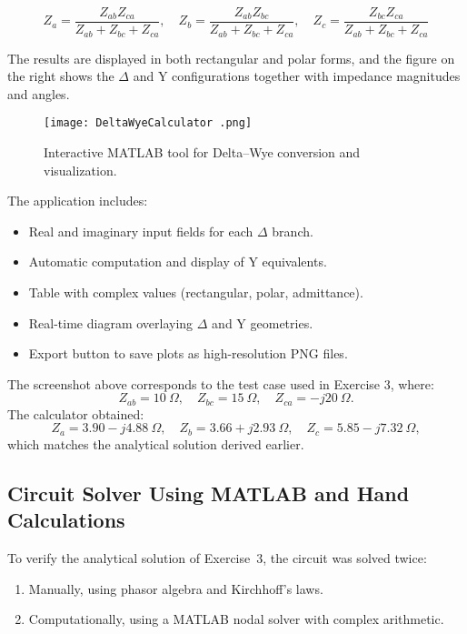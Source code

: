\documentclass{article}
\begin{document}
\[
Z_a = \frac{Z_{ab} Z_{ca}}{Z_{ab} + Z_{bc} + Z_{ca}}, \quad
Z_b = \frac{Z_{ab} Z_{bc}}{Z_{ab} + Z_{bc} + Z_{ca}}, \quad
Z_c = \frac{Z_{bc} Z_{ca}}{Z_{ab} + Z_{bc} + Z_{ca}}
\]

The results are displayed in both rectangular and polar forms, and the figure on the right shows the $\Delta$ and $\text{Y}$ configurations together with impedance magnitudes and angles.

\begin{figure}[H]
    \centering
    \texttt{[image: DeltaWyeCalculator .png]}
    \caption{Interactive MATLAB tool for Delta–Wye conversion and visualization.}
\end{figure}

\noindent
The application includes:
\begin{itemize}
    \item Real and imaginary input fields for each $\Delta$ branch.
    \item Automatic computation and display of $\text{Y}$ equivalents.
    \item Table with complex values (rectangular, polar, admittance).
    \item Real-time diagram overlaying $\Delta$ and $\text{Y}$ geometries.
    \item Export button to save plots as high-resolution PNG files.
\end{itemize}

The screenshot above corresponds to the test case used in Exercise 3, where:
\[
Z_{ab}=10~\Omega,\quad Z_{bc}=15~\Omega,\quad Z_{ca}=-j20~\Omega.
\]
The calculator obtained:
\[
Z_a = 3.90 - j4.88~\Omega, \quad
Z_b = 3.66 + j2.93~\Omega, \quad
Z_c = 5.85 - j7.32~\Omega,
\]
which matches the analytical solution derived earlier.



\subsection*{Circuit Solver Using MATLAB and Hand Calculations}

To verify the analytical solution of Exercise~3, the circuit was solved twice:
\begin{enumerate}
    \item Manually, using phasor algebra and Kirchhoff’s laws.
    \item Computationally, using a MATLAB nodal solver with complex arithmetic.
\end{enumerate}
\end{document}
